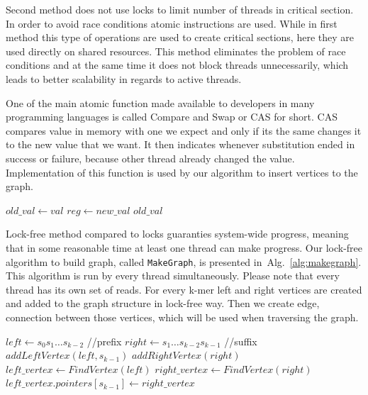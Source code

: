 \documentclass[12pt]{article}
\begin{document}
Second method does not use locks to limit number of threads in critical section. In order to avoid race conditions atomic instructions are used. While in first method this type of operations are used to create critical sections, here they are used directly on shared resources. This method eliminates the problem of race conditions and at the same time it does not block threads unnecessarily, which leads to better scalability in regards to active threads.

One of the main atomic function made available to developers in many programming languages is called Compare and Swap or CAS for short. CAS compares value in memory with one we expect and only if its the same changes it to the new value that we want. It then indicates whenever substitution ended in success or failure, because other thread already changed the value. Implementation of this function is used by our algorithm to insert vertices to the graph.
\begin{algorithm}[!htb]
\begin{algorithmic}[1]
\State $old\_val \gets val$
\State $reg \gets new\_val$
\EndIf
\State \Return $old\_val$
\EndFunction
\end{algorithmic}
\caption{Compare and Swap Function}
\label{alg:CAS}
\end{algorithm}

Lock-free method compared to locks guaranties system-wide progress, meaning that in some reasonable time at least one thread can make progress.
Our lock-free algorithm to build graph, called \texttt{MakeGraph}, is presented in~Alg.~\ref{alg:makegraph}.
This algorithm is run by every thread simultaneously. Please note that every thread has its own set of reads.
For every k-mer left and right vertices are created and added to the graph structure in lock-free way.
Then we create edge, connection between those vertices, which will be used when traversing the graph.

\begin{algorithm}[!htb]
\begin{algorithmic}[1]
\State $left \gets s_{0}s_{1}\dots{}s_{k-2}$ //prefix
\State $right \gets s_{1}\dots{}s_{k-2}s_{k-1}$ //suffix
\State $addLeftVertex(left, s_{k-1})$
\State $addRightVertex(right)$
\State $left\_vertex \gets FindVertex(left)$
\State $right\_vertex \gets FindVertex(right)$
\State $left\_vertex.pointers[s_{k-1}] \gets right\_vertex$
\EndFor
\EndFor
\EndFunction
\end{algorithmic}
\caption{Graph build algorithm}
\label{alg:makegraph}
\end{algorithm}
\end{document}
